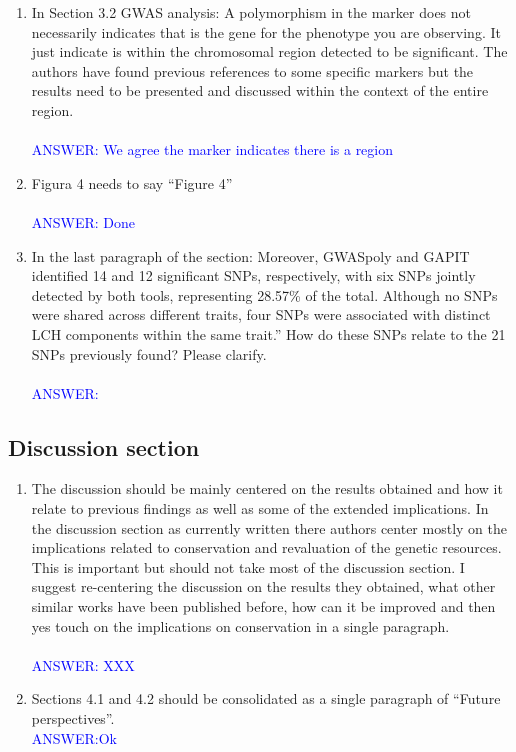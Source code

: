 \documentclass{article}
\begin{document}
\begin{enumerate}
    \textcolor{blue}{ANSWER: Variables were explicitly mentioned in section 2.2.2, where we have added the missing citations. Also, We added a supplementary file with the data used. }
    \item In Section 3.2 GWAS analysis: A polymorphism in the marker does not necessarily indicates that is the gene for the phenotype you are observing. It just indicate is within the chromosomal region detected to be significant. The authors have found previous references to some specific markers but the results need to be presented and discussed within the context of the entire region.\\\\
    \textcolor{blue}{ANSWER: We agree the marker indicates there is a region}
    \item Figura 4 needs to say “Figure 4”\\\\
    \textcolor{blue}{ANSWER: Done}
    \item In the last paragraph of the section: Moreover, GWASpoly and GAPIT identified 14 and 12 significant SNPs, respectively, with six SNPs jointly detected by both tools, representing 28.57\% of the total. Although no SNPs were shared across different traits, four SNPs were associated with distinct LCH components within the same trait.” How do these SNPs relate to the 21 SNPs previously found? Please clarify.\\\\
    \textcolor{blue}{ANSWER: }
    
\end{enumerate}


\subsection{Discussion section}

\begin{enumerate}
    \item The discussion should be mainly centered on the results obtained and how it relate to previous findings as well as some of the extended implications. In the discussion section as currently written there authors center mostly on the implications related to conservation and revaluation of the genetic resources. This is important but should not take most of the discussion section. I suggest re-centering the discussion on the results they obtained, what other similar works have been published before, how can it be improved and then yes touch on the implications on conservation in a single paragraph.\\\\
    \textcolor{blue}{ANSWER: XXX}
    \item Sections 4.1 and 4.2 should be consolidated as a single paragraph of “Future perspectives”. \\
    \textcolor{blue}{ANSWER:Ok}

\end{enumerate}
\end{document}
